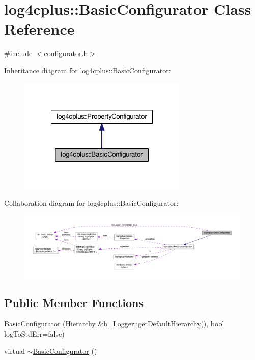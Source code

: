 \hypertarget{classlog4cplus_1_1BasicConfigurator}{\section{log4cplus\-:\-:Basic\-Configurator Class Reference}
\label{classlog4cplus_1_1BasicConfigurator}
}


{\ttfamily \#include $<$configurator.\-h$>$}



Inheritance diagram for log4cplus\-:\-:Basic\-Configurator\-:
\nopagebreak
\begin{figure}[H]
\begin{center}
\leavevmode
\includegraphics[width=228pt]{classlog4cplus_1_1BasicConfigurator__inherit__graph}
\end{center}
\end{figure}


Collaboration diagram for log4cplus\-:\-:Basic\-Configurator\-:
\nopagebreak
\begin{figure}[H]
\begin{center}
\leavevmode
\includegraphics[width=350pt]{classlog4cplus_1_1BasicConfigurator__coll__graph}
\end{center}
\end{figure}
\subsection*{Public Member Functions}
\begin{DoxyCompactItemize}
\item 
\hyperlink{classlog4cplus_1_1BasicConfigurator_a9b436448ca7bac7f76a983ee6bcccbaf}{Basic\-Configurator} (\hyperlink{classlog4cplus_1_1Hierarchy}{Hierarchy} \&\hyperlink{classlog4cplus_1_1PropertyConfigurator_ae80f772be9d4eb67922d34f4e2dd71d1}{h}=\hyperlink{classlog4cplus_1_1Logger_a8d258d78a9a86f1f3a3241f43d015287}{Logger\-::get\-Default\-Hierarchy}(), bool log\-To\-Std\-Err=false)
\item 
virtual \hyperlink{classlog4cplus_1_1BasicConfigurator_a3a5a9d31d91df8b6db34803c0960ae3f}{$\sim$\-Basic\-Configurator} ()
\end{DoxyCompactItemize}
